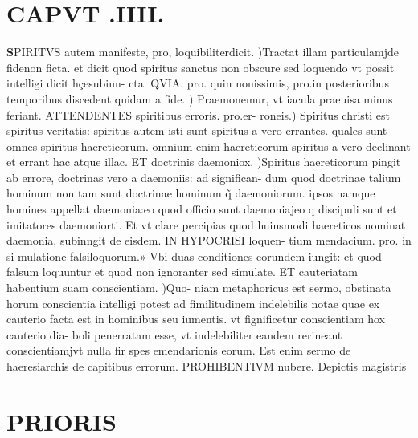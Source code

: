 \documentclass{article}
\begin{document}
\begin{pages}
\endnumbering\beginnumbering\section{CAPVT .IIII.}\pstart \huge\textbf{S}\normalsize PIRITVS autem manifeste, pro, loquibiliterdicit. )Tractat illam particulamjde fidenon ficta. et dicit quod spiritus sanctus non obscure sed loquendo vt possit intelligi dicit hçesubiun- cta. QVIA. pro. quin nouissimis, pro.in posterioribus temporibus discedent quidam a fide. ) Praemonemur, vt iacula praeuisa minus feriant. ATTENDENTES spiritibus erroris. pro.er- roneis.) Spiritus christi est spiritus veritatis: spiritus autem isti sunt spiritus a vero errantes. quales sunt omnes spiritus haereticorum. omnium enim haereticorum spiritus a vero declinant et errant hac atque illac. ET doctrinis daemoniox. )Spiritus haereticorum pingit ab errore, doctrinas vero a daemoniis: ad significan- dum quod doctrinae talium hominum non tam sunt doctrinae hominum q̃ daemoniorum. ipsos namque homines appellat daemonia:eo quod officio sunt daemoniajeo q discipuli sunt et imitatores daemoniorti. Et vt clare percipias quod huiusmodi haereticos nominat daemonia, subinngit de eisdem. IN HYPOCRISI loquen- tium mendacium. pro. in si mulatione falsiloquorum.» Vbi duas conditiones eorundem iungit: et quod falsum loquuntur et quod non ignoranter sed simulate. ET cauteriatam habentium suam conscientiam. )Quo- niam metaphoricus est sermo, obstinata horum conscientia intelligi potest ad fimilitudinem indelebilis notae quae ex cauterio facta est in hominibus seu iumentis. vt fignificetur conscientiam hox cauterio dia- boli penerratam esse, vt indelebiliter eandem rerineant conscientiamjvt nulla fir spes emendarionis eorum. Est enim sermo de haeresiarchis de capitibus errorum. PROHIBENTIVM nubere. Depictis magistris  \pend
\section*{PRIORIS }

\end{pages}
\end{document}
